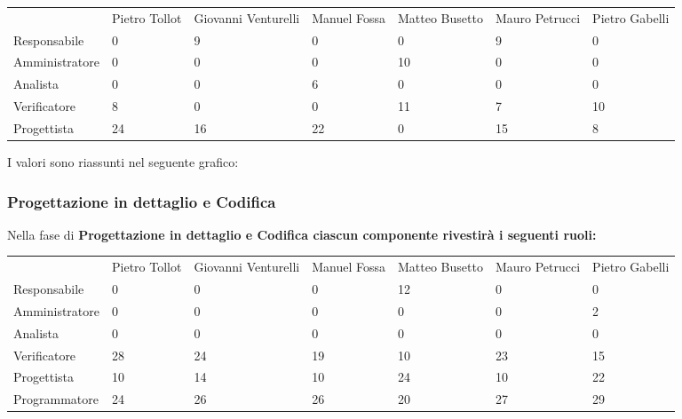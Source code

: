 \begin{table}[h] %
\begin{tabular}{lllllll}
               & Pietro Tollot & Giovanni Venturelli & Manuel Fossa & Matteo Busetto & Mauro Petrucci & Pietro Gabelli \\
Responsabile   & 0             & 9                   & 0            & 0              & 9              & 0              \\
Amministratore & 0             & 0                   & 0            & 10             & 0              & 0              \\
Analista       & 0             & 0                   & 6            & 0              & 0              & 0              \\
Verificatore   & 8             & 0                   & 0            & 11             & 7              & 10             \\
Progettista    & 24            & 16                  & 22           & 0              & 15             & 8             
\end{tabular}
\end{table}

I valori sono riassunti nel seguente grafico:


\subsubsection{Progettazione in dettaglio e Codifica}
Nella fase di \bf{Progettazione in dettaglio e Codifica} ciascun componente rivestir\`{a} i seguenti ruoli:

\begin{table}[h] %
\begin{tabular}{lllllll}
               & Pietro Tollot & Giovanni Venturelli & Manuel Fossa & Matteo Busetto & Mauro Petrucci & Pietro Gabelli \\
Responsabile   & 0             & 0                   & 0            & 12             & 0              & 0              \\
Amministratore & 0             & 0                   & 0            & 0              & 0              & 2              \\
Analista       & 0             & 0                   & 0            & 0              & 0              & 0              \\
Verificatore   & 28            & 24                  & 19           & 10             & 23             & 15             \\
Progettista    & 10            & 14                  & 10           & 24             & 10             & 22             \\
Programmatore  & 24            & 26                  & 26           & 20             & 27             & 29            
\end{tabular}
\end{table}

